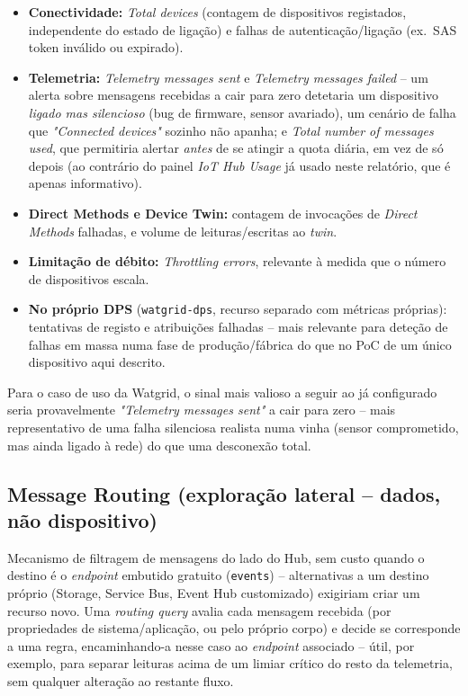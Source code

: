 \documentclass[a4paper,12pt]{article}
\begin{document}
\begin{itemize}
    \item \textbf{Conectividade:} \textit{Total devices} (contagem de dispositivos registados, independente do estado de ligação) e falhas de autenticação/ligação (ex.\ SAS token inválido ou expirado).
    \item \textbf{Telemetria:} \textit{Telemetry messages sent} e \textit{Telemetry messages failed} -- um alerta sobre mensagens recebidas a cair para zero detetaria um dispositivo \textit{ligado mas silencioso} (bug de firmware, sensor avariado), um cenário de falha que \textit{"Connected devices"} sozinho não apanha; e \textit{Total number of messages used}, que permitiria alertar \textit{antes} de se atingir a quota diária, em vez de só depois (ao contrário do painel \textit{IoT Hub Usage} já usado neste relatório, que é apenas informativo).
    \item \textbf{Direct Methods e Device Twin:} contagem de invocações de \textit{Direct Methods} falhadas, e volume de leituras/escritas ao \textit{twin}.
    \item \textbf{Limitação de débito:} \textit{Throttling errors}, relevante à medida que o número de dispositivos escala.
    \item \textbf{No próprio DPS} (\texttt{watgrid-dps}, recurso separado com métricas próprias): tentativas de registo e atribuições falhadas -- mais relevante para deteção de falhas em massa numa fase de produção/fábrica do que no PoC de um único dispositivo aqui descrito.
\end{itemize}

Para o caso de uso da Watgrid, o sinal mais valioso a seguir ao já configurado seria provavelmente \textit{"Telemetry messages sent"} a cair para zero -- mais representativo de uma falha silenciosa realista numa vinha (sensor comprometido, mas ainda ligado à rede) do que uma desconexão total.

\subsection{Message Routing (exploração lateral -- dados, não dispositivo)}
Mecanismo de filtragem de mensagens do lado do Hub, sem custo quando o destino é o \textit{endpoint} embutido gratuito (\texttt{events}) -- alternativas a um destino próprio (Storage, Service Bus, Event Hub customizado) exigiriam criar um recurso novo. Uma \textit{routing query} avalia cada mensagem recebida (por propriedades de sistema/aplicação, ou pelo próprio corpo) e decide se corresponde a uma regra, encaminhando-a nesse caso ao \textit{endpoint} associado -- útil, por exemplo, para separar leituras acima de um limiar crítico do resto da telemetria, sem qualquer alteração ao restante fluxo.
\end{document}
